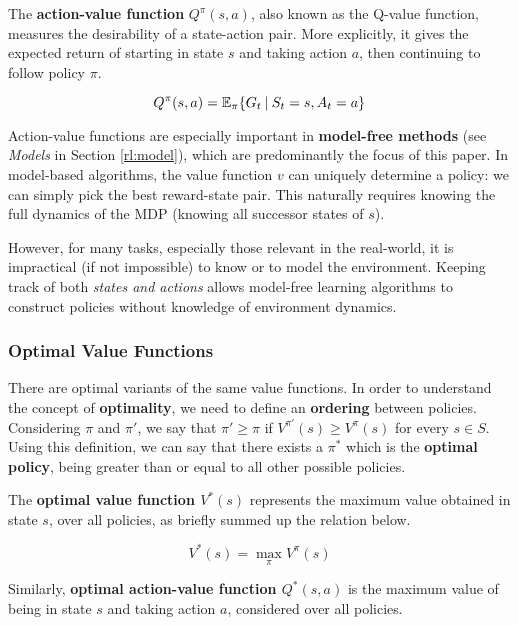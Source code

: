 The \textbf{action-value function} \(Q^{\pi}(s, a)\), also known as the Q-value function, measures the desirability of a state-action pair.
More explicitly, it gives the expected return of starting in state $s$ and taking action $a$, then continuing to follow policy $\pi$.

\begin{equation}
    Q^{\pi}(s, a) = \mathbb{E}_{\pi}\{ G_t \:\vert\: S_t = s, A_t = a \}
\end{equation}

Action-value functions are especially important in \textbf{model-free methods} (see \emph{Models} in Section \ref{rl:model}), which are predominantly the focus of this paper.
In model-based algorithms, the value function $v$ can uniquely determine a policy: we can simply pick the best reward-state pair.
This naturally requires knowing the full dynamics of the MDP (knowing all successor states of $s$).

However, for many tasks, especially those relevant in the real-world, it is impractical (if not impossible) to know or to model the environment.
Keeping track of both \emph{states and actions} allows model-free learning algorithms to construct policies without knowledge of environment dynamics.

\subsubsection{Optimal Value Functions}

There are optimal variants of the same value functions.
In order to understand the concept of \textbf{optimality}, we need to define an \textbf{ordering} between policies.
Considering $\pi$ and $\pi'$, we say that $\pi' \geq \pi$ if $V^{\pi'}(s) \geq V^{\pi}(s)$ for every $s \in S$.
Using this definition, we can say that there exists a $\pi^{*}$ which is the \textbf{optimal policy}, being greater than or equal to all other possible policies.

The \textbf{optimal value function $V^*(s)$} represents the maximum value obtained in state $s$, over all policies, as briefly summed up the relation below.

\begin{equation} \label{eqn:opt-value-fun}
    V^*(s) = \max_{\pi}{V^{\pi}(s)}
\end{equation}

Similarly, \textbf{optimal action-value function $Q^*(s, a)$} is the maximum value of being in state $s$ and taking action $a$, considered over all policies.

